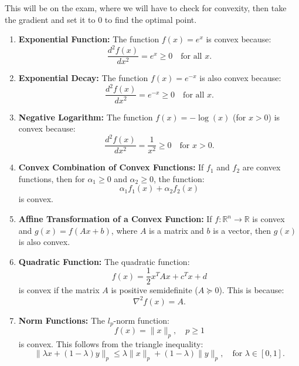 \begin{warning}
    This will be on the exam, where we will have to check for convexity, then take the gradient and set it to 0 to find the optimal point.
\end{warning}

\begin{example}
    \begin{enumerate}
        \item \textbf{Exponential Function:} The function $f(x) = e^x$ is convex because:
        \[
        \frac{d^2 f(x)}{dx^2} = e^x \geq 0 \quad \text{for all } x.
        \]
    
        \item \textbf{Exponential Decay:} The function $f(x) = e^{-x}$ is also convex because:
        \[
        \frac{d^2 f(x)}{dx^2} = e^{-x} \geq 0 \quad \text{for all } x.
        \]

        \item \textbf{Negative Logarithm:} The function $f(x) = -\log(x)$ (for $x > 0$) is convex because:
        \[
        \frac{d^2 f(x)}{dx^2} = \frac{1}{x^2} \geq 0 \quad \text{for } x > 0.
        \]
    
        \item \textbf{Convex Combination of Convex Functions:} If $f_1$ and $f_2$ are convex functions, then for $\alpha_1 \geq 0$ and $\alpha_2 \geq 0$, the function:
        \[
        \alpha_1 f_1(x) + \alpha_2 f_2(x)
        \]
        is convex.
    
        \item \textbf{Affine Transformation of a Convex Function:} If $f: \mathbb{R}^n \to \mathbb{R}$ is convex and $g(x) = f(Ax + b)$, where $A$ is a matrix and $b$ is a vector, then $g(x)$ is also convex.
    
        \item \textbf{Quadratic Function:} The quadratic function:
        \[
        f(x) = \frac{1}{2}x^T A x + c^T x + d
        \]
        is convex if the matrix $A$ is positive semidefinite ($A \succeq 0$). This is because:
        \[
        \nabla^2 f(x) = A.
        \]
    
        \item \textbf{Norm Functions:} The $l_p$-norm function:
        \[
        f(x) = \|x\|_p, \quad p \geq 1
        \]
        is convex. This follows from the triangle inequality:
        \[
        \|\lambda x + (1 - \lambda)y\|_p \leq \lambda \|x\|_p + (1 - \lambda)\|y\|_p, \quad \text{for } \lambda \in [0, 1].
        \]
    \end{enumerate}    
\end{example}









